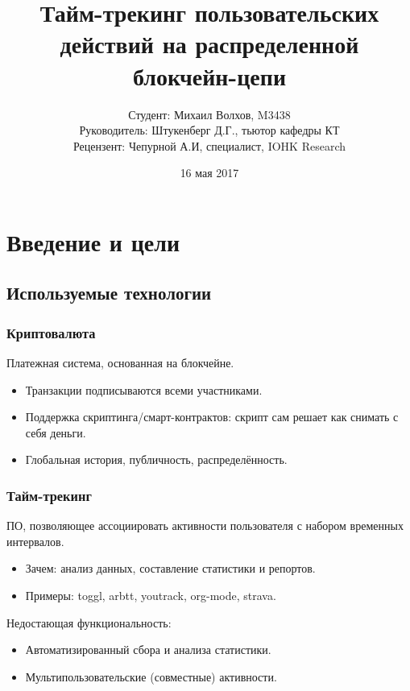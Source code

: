 \documentclass[11pt,handout,pdf,hyperref={unicode}]{beamer}
\title[Тайм-трекинг на блокчейне]{Тайм-трекинг пользовательских действий на распределенной блокчейн-цепи}
\begin{document}
\author[Михаил Волхов, M3438]{
  Студент: Михаил Волхов, M3438\\
  Руководитель: Штукенберг Д.Г., тьютор кафедры КТ \\
  Рецензент: Чепурной А.И, специалист, IOHK Research
}
\date{16 мая 2017}

\frame{\titlepage}

\section{Введение и цели}

\subsection{Используемые технологии}

\begin{frame}
  \frametitle{Криптовалюта}

  Платежная система, основанная на блокчейне.
  \begin{itemize}
  \item Транзакции подписываются всеми участниками.
  \item Поддержка скриптинга/смарт-контрактов: скрипт сам решает как
    снимать с себя деньги.
  \item Глобальная история, публичность, распределённость.
  \end{itemize}
\end{frame}

\begin{frame}[fragile]
  \frametitle{Тайм-трекинг}

  ПО, позволяющее ассоциировать активности пользователя с набором
  временных интервалов.

  \begin{itemize}
  \item Зачем: анализ данных, составление статистики и репортов.
  \item Примеры: toggl, arbtt, youtrack, org-mode, strava.
  \end{itemize}

  Недостающая функциональность:
  \begin{itemize}
  \item Автоматизированный сбора и анализа статистики.
  \item Мультипользовательские (совместные) активности.
  \end{itemize}

\end{frame}
\end{document}
